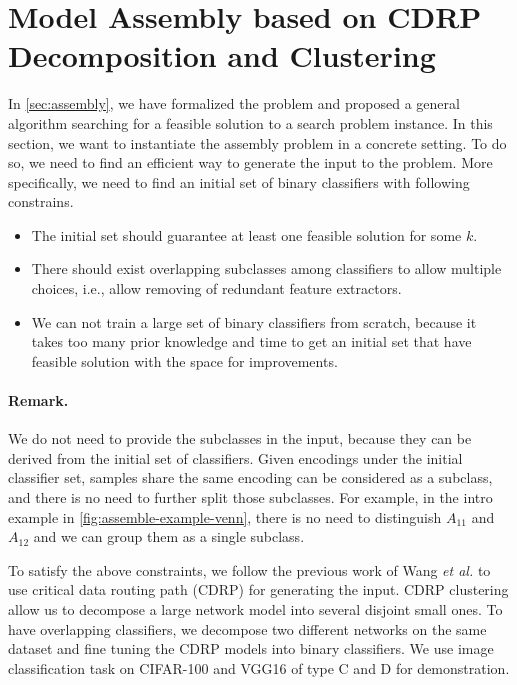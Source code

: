 \documentclass[sigplan,10pt,review]{acmart}\settopmatter{printfolios=true,printccs=false,printacmref=false}
\begin{document}
\section{Model Assembly based on CDRP Decomposition and Clustering}
\label{sec:cdrp}
In \cref{sec:assembly}, we have formalized the problem and proposed a general algorithm searching for a feasible solution to a search problem instance.
In this section, we want to instantiate the assembly problem in a concrete setting.
To do so, we need to find an efficient way to generate the input to the problem.
More specifically, we need to find an initial set of binary classifiers with following constrains.
\begin{itemize}
	\item The initial set should guarantee at least one feasible solution for some $k$.
	\item There should exist overlapping subclasses among classifiers to allow multiple choices, i.e., allow removing of redundant feature extractors.
	\item We can not train a large set of binary classifiers from scratch, because it takes too many prior knowledge and time to get an initial set that have feasible solution with the space for improvements.
\end{itemize}



\paragraph{Remark.} We do not need to provide the subclasses in the input, because they can be derived from the initial set of classifiers.
Given encodings under the initial classifier set, samples share the same encoding can be considered as a subclass, and there is no need to further split those subclasses.
For example, in the intro example in \cref{fig:assemble-example-venn}, there is no need to distinguish $A_{11}$ and $A_{12}$ and we can group them as a single subclass.

To satisfy the above constraints, we follow the previous work of Wang \textit{et al.} \cite{wang2018interpret} to use critical data routing path (CDRP) for generating the input.
CDRP clustering allow us to decompose a large network model into several disjoint small ones.
To have overlapping classifiers, we decompose two different networks on the same dataset and fine tuning the CDRP models into binary classifiers.
We use image classification task on CIFAR-100 and VGG16 of type C and D for demonstration.
\end{document}
